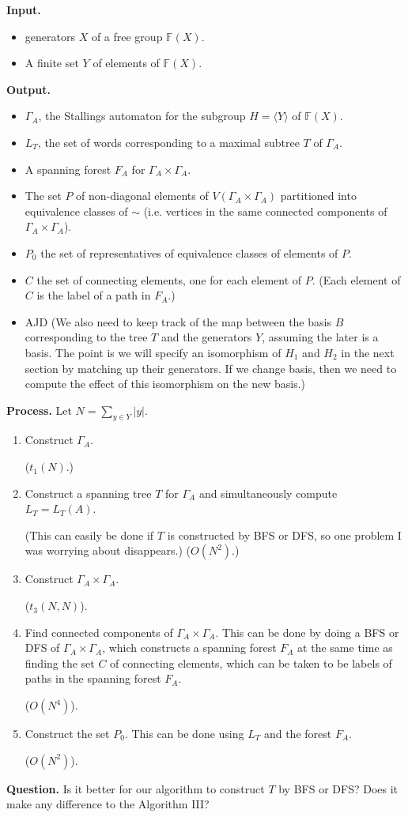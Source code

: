\documentclass[a4paper,12pt]{article}
\newcommand{\G}{\Gamma }
\numberwithin{equation}{section}
\numberwithin{figure}{section}
\newcommand{\FF}{\ensuremath{\mathbb{F}}}
\newcommand{\la}{\langle}
\newcommand{\ra}{\rangle}
\newcommand{\be}{\begin{enumerate}}
\newcommand{\ee}{\end{enumerate}}
\newcommand{\biz}{\begin{itemize}}
\newcommand{\eiz}{\end{itemize}}
\newenvironment{ajd1}{\noindent\color{red} AJD }{}
\newcommand{\ajd}[1]{\begin{ajd1} #1 \end{ajd1}}
\begin{document}
\noindent\textbf{Input.}
\biz
\item generators $X$ of a free group $\FF(X)$.
\item A finite set $Y$ of elements of $\FF(X)$.
\eiz
\noindent\textbf{Output.}
\biz
\item
$\G_A$, the Stallings automaton for the subgroup $H=\la Y\ra$ of $\FF(X)$.
\item
$L_T$, the set of words corresponding to a  maximal subtree $T$ of $\G_A$.
\item A spanning forest $F_A$ for $\G_A\times \G_A$. 
\item The set $P$ of non-diagonal elements of $V( \G_A\times \G_A)$
partitioned into equivalence classes of $\sim$ (i.e. vertices in the
same connected components of $\G_A\times \G_A$).
\item $P_0$ the set of representatives of equivalence classes of
elements of $P$.
\item $C$ the set of connecting elements, one for each element of $P$.
(Each element of $C$ is the label of a path in $F_A$.) 
\item \ajd{(We also need to keep track of the map between the basis $B$ corresponding to the tree $T$ and the generators $Y$, assuming the later is a basis. 
The point is we will specify an isomorphism of $H_1$ and $H_2$ in the
next section by matching up their generators. If we change basis, then
we need to compute the effect of this isomorphism on the new basis.)}
\eiz
\noindent\textbf{Process.}
Let $N=\sum_{y\in Y} |y|$.
\be[{A}1]
\item Construct $\G_A$.
\begin{comp}
($t_1(N)$.)
\end{comp}
\item Construct a spanning tree $T$ for $\G_A$ and simultaneously
compute $L_T=L_T(A)$.
\begin{comp}
(This can easily be done if $T$ is constructed by
BFS or DFS, so one problem I was worrying about disappears.) ($O(N^2)$.)
\end{comp}
\item Construct $\G_A\times \G_A$.
\begin{comp}
($t_3(N,N)$).
\end{comp}
\item Find connected components of $\G_A\times \G_A$. This can be
done by doing a BFS or DFS of $\G_A\times \G_A$, which constructs
a spanning forest $F_A$ at the same time as finding the set $C$ of
connecting elements,
which can be taken to be labels of paths in the spanning forest $F_A$.
\begin{comp}
($O(N^4)$).
\end{comp}
\item Construct the set $P_0$. This can be done using $L_T$ and
the forest $F_A$.
\begin{comp}
($O(N^2)$).
\end{comp}
\ee
\begin{comp}\noindent\textbf{Question.} Is it better for our algorithm
to construct $T$ by BFS or DFS? Does it make any difference to the
Algorithm III?
\end{comp}
\end{document}
